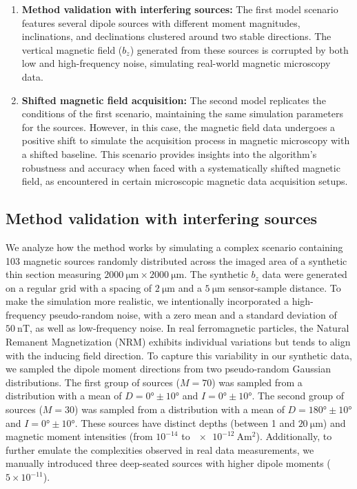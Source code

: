 \begin{enumerate}
\item \textbf{Method validation with interfering sources:}
The first model scenario features several dipole sources with different moment magnitudes, inclinations, and declinations clustered around two stable directions. The vertical magnetic field ($b_z$) generated from these sources is corrupted by both low and high-frequency noise, simulating real-world magnetic microscopy data. 

\item \textbf{Shifted magnetic field acquisition:}
The second model replicates the conditions of the first scenario, maintaining the same simulation parameters for the sources. However, in this case, the magnetic field data undergoes a positive shift to simulate the acquisition process in magnetic microscopy with a shifted baseline. This scenario provides insights into the algorithm's robustness and accuracy when faced with a systematically shifted magnetic field, as encountered in certain microscopic magnetic data acquisition setups.
\end{enumerate}

\subsection{Method validation with interfering sources}\label{non-shifted}

We analyze how the method works by simulating a complex scenario containing 103 magnetic sources randomly distributed across the imaged area of a synthetic thin section measuring $\qty{2000}{\um} \times \qty{2000}{\um}$. The synthetic $b_z$ data were generated on a regular grid with a spacing of $\qty{2}{\um}$ and a $\qty{5}{\um}$ sensor-sample distance. To make the simulation more realistic, we intentionally incorporated a high-frequency pseudo-random noise, with a zero mean and a standard deviation of $\qty{50}{\nano\tesla}$, as well as low-frequency noise. In real ferromagnetic particles, the Natural Remanent Magnetization (NRM) exhibits individual variations but tends to align with the inducing field direction. To capture this variability in our synthetic data, we sampled the dipole moment directions from two pseudo-random Gaussian distributions. The first group of sources ($M = 70$) was sampled from a distribution with a mean of $D = \ang{0}\pm\ang{10}$ and $I = \ang{0}\pm\ang{10}$. The second group of sources ($M = 30$) was sampled from a distribution with a mean of $D = \ang{180}\pm\ang{10}$ and $I = \ang{0}\pm\ang{10}$. These sources have distinct depths (between 1 and $\qty{20}{\um}$) and magnetic moment intensities (from $10^{-14}$ to $\qty{e-12}{\ampere\m\squared}$). Additionally, to further emulate the complexities observed in real data measurements, we manually introduced three deep-seated sources with higher dipole moments ($5 \times 10^{-11}$). 

